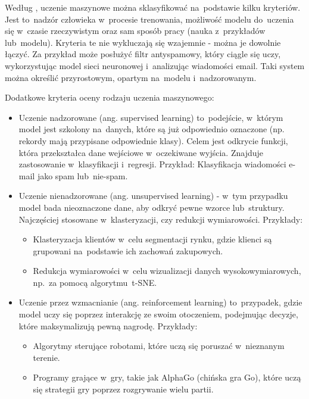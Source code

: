 Według \cite{Geron2020}, uczenie maszynowe można sklasyfikować na~podstawie kilku kryteriów.
Jest to~nadzór człowieka w~procesie trenowania, możliwość modelu do~uczenia się w~czasie rzeczywistym
oraz sam sposób pracy (nauka z~przykładów lub~modelu). Kryteria te nie wykluczają się wzajemnie - można je dowolnie łączyć.
Za przykład może posłużyć filtr antyspamowy, który ciągle się uczy,
wykorzystując model sieci neuronowej i~analizując wiadomości email.
Taki system można określić przyrostowym, opartym na~modelu i~nadzorowanym.

Dodatkowe kryteria oceny rodzaju uczenia maszynowego:
\begin{itemize}[label=-,labelsep=0.4cm,leftmargin=0.6cm]
    \item Uczenie nadzorowane (ang. supervised learning) to~podejście, w~którym model jest szkolony na~danych,
        które są już odpowiednio oznaczone (np. rekordy mają przypisane odpowiednie klasy).
        Celem jest odkrycie funkcji, która przekształca dane wejściowe w~oczekiwane wyjścia.
        Znajduje zastosowanie w~klasyfikacji i~regresji.
        Przykład: Klasyfikacja wiadomości e-mail jako spam lub~nie-spam.
    \item Uczenie nienadzorowane (ang. unsupervised learning)
        - w~tym przypadku model bada nieoznaczone dane, aby odkryć pewne wzorce lub~struktury.
        Najczęściej stosowane w~klasteryzacji, czy redukcji wymiarowości. Przykłady:
        \begin{itemize}[label=*,labelsep=0.4cm,leftmargin=0.8cm]
            \item Klasteryzacja klientów w~celu segmentacji rynku, gdzie klienci są grupowani na~podstawie ich zachowań zakupowych. 
            \item Redukcja wymiarowości w~celu wizualizacji danych wysokowymiarowych, np.~za pomocą algorytmu~t-SNE.
        \end{itemize}
    \item Uczenie przez wzmacnianie (ang. reinforcement learning) to~przypadek,
        gdzie model uczy się poprzez interakcję ze swoim otoczeniem,
        podejmując decyzje, które maksymalizują pewną nagrodę. Przykłady:
        \begin{itemize}[label=*,labelsep=0.4cm,leftmargin=0.8cm]
            \item Algorytmy sterujące robotami, które uczą się poruszać w~nieznanym terenie. 
            \item Programy grające w~gry, takie jak AlphaGo (chińska gra Go), które uczą się strategii gry poprzez rozgrywanie wielu partii.
        \end{itemize}
\end{itemize}